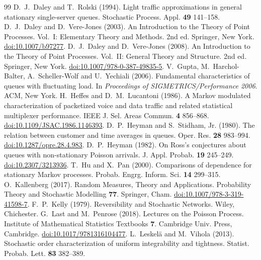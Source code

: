 \documentclass[10pt,a4paper]{amsart}
\numberwithin{equation}{section}
\newcommand{\1}{\mathbf 1}
\begin{document}
\begin{thebibliography}{99}
 D.~J.~Daley and T.~Rolski (1994). Light traffic approximations in general stationary single-server queues. Stochastic Process. Appl. \textbf{49} 141--158.
 D.~J.~Daley and D.~Vere-Jones (2003). An Introduction to the Theory of Point Processes. Vol.~I: Elementary Theory and Methods. 2nd ed. Springer, New York. \href{https://doi.org/10.1007/b97277}{doi:10.1007/b97277}.
 D.~J.~Daley and D.~Vere-Jones (2008). An Introduction to the Theory of Point Processes. Vol.~II: General Theory and Structure. 2nd ed. Springer, New York. \href{https://doi.org/10.1007/978-0-387-49835-5}{doi:10.1007/978-0-387-49835-5}.
 V.~Gupta, M.~Harchol-Balter, A.~Scheller-Wolf and U.~Yechiali (2006). Fundamental characteristics of queues with fluctuating load. In \emph{Proceedings of SIGMETRICS/Performance 2006}. ACM, New York.
 H.~Heffes and D.~M.~Lucantoni (1986). A Markov modulated characterization of packetized voice and data traffic and related statistical multiplexer performance. IEEE J. Sel. Areas Commun. \textbf{4} 856--868. \href{https://doi.org/10.1109/JSAC.1986.1146393}{doi:10.1109/JSAC.1986.1146393}.
 D.~P.~Heyman and S.~Stidham, Jr. (1980). The relation between customer and time averages in queues. Oper. Res. \textbf{28} 983--994. \href{https://doi.org/10.1287/opre.28.4.983}{doi:10.1287/opre.28.4.983}.
 D.~P.~Heyman (1982). On Ross's conjectures about queues with non-stationary Poisson arrivals. J. Appl. Probab. \textbf{19} 245--249. \href{https://doi.org/10.2307/3213936}{doi:10.2307/3213936}.
 T.~Hu and X.~Pan (2000). Comparisons of dependence for stationary Markov processes. Probab. Engrg. Inform. Sci. \textbf{14} 299--315.
 O.~Kallenberg (2017). Random Measures, Theory and Applications. Probability Theory and Stochastic Modelling \textbf{77}. Springer, Cham. \href{https://doi.org/10.1007/978-3-319-41598-7}{doi:10.1007/978-3-319-41598-7}.
 F.~P.~Kelly (1979). Reversibility and Stochastic Networks. Wiley, Chichester.
 G.~Last and M.~Penrose (2018). Lectures on the Poisson Process. Institute of Mathematical Statistics Textbooks \textbf{7}. Cambridge Univ. Press, Cambridge. \href{https://doi.org/10.1017/9781316104477}{doi:10.1017/9781316104477}.
 L.~Leskel\"a and M.~Vihola (2013). Stochastic order characterization of uniform integrability and tightness. Statist. Probab. Lett. \textbf{83} 382--389.

\end{thebibliography}
\end{document}
